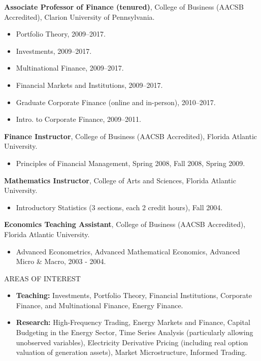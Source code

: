 \documentclass[9pt]{article}
\begin{document}
{\bf Associate Professor of Finance (tenured)}, College of Business (AACSB Accredited), Clarion University of Pennsylvania.
\begin{itemize}[noitemsep, nolistsep]
\item Portfolio Theory, 2009--2017.
\item Investments, 2009--2017.
\item Multinational Finance, 2009--2017.
\item Financial Markets and Institutions, 2009--2017.
\item Graduate Corporate Finance (online and in-person), 2010--2017.
\item Intro. to Corporate Finance, 2009--2011.
\end{itemize}
{\bf Finance Instructor}, College of Business (AACSB Accredited), Florida Atlantic University.
\begin{itemize}[noitemsep, nolistsep]
\item Principles of Financial Management, Spring 2008, Fall 2008, Spring 2009.
\end{itemize}
{\bf Mathematics Instructor}, College of Arts and Sciences, Florida Atlantic University.
\begin{itemize}[noitemsep, nolistsep]
\item Introductory Statistics (3 sections, each 2 credit hours), Fall 2004.
\end{itemize}
{\bf Economics Teaching Assistant}, College of Business (AACSB Accredited), Florida Atlantic University.
\begin{itemize}[noitemsep, nolistsep]
\item Advanced Econometrics, Advanced Mathematical Economics, Advanced Micro \& Macro, 2003 - 2004.
\end{itemize}
\vspace{10pt}
AREAS OF INTEREST
\begin{itemize}[noitemsep, nolistsep]
\item {\bf Teaching:} Investments, Portfolio Theory, Financial Institutions, Corporate Finance, and Multinational Finance, Energy Finance.
\item {\bf Research:} High-Frequency Trading, Energy Markets and Finance, Capital Budgeting in the Energy Sector, Time Series Analysis (particularly allowing unobserved variables), Electricity Derivative Pricing (including real option valuation of generation assets), Market Microstructure, Informed Trading.
\end{itemize}
\vspace{10pt}
\end{document}
